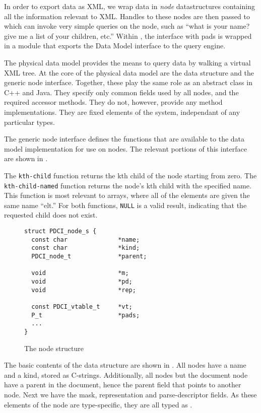 
In order to export \pads{} data as XML, we wrap data in {\em node}
datastructures containing all the information relevant to XML. Handles
to these nodes are then passed to \galax which can invoke very simple
queries on the node, such as ``what is your name? give me a list of
your children, etc.''  Within \galax, the interface with pads is
wrapped in a module that exports the \galax Data Model interface to
the \galax query engine.

The physical data model provides the means to query \pads{} data by
walking a virtual XML tree.  At the core of the physical data model
are the  data structure and the generic node interface.
Together, these play the same role as an abstract class in C++ and
Java. They specify only common fields used by all nodes, and the
required accessor methods. They do not, however, provide any method
implementations. They are fixed elements of the system, independant of
any particular \pads{} types.

The generic node interface defines the functions that are available to the
\pads{} data model implementation for use on nodes. The relevant portions of
this interface are shown in .

The {\tt kth-child} function returns the kth child of the node
starting from zero. The {\tt kth-child-named} function returns the node's kth
child with the specified name. This function is most relevant to
arrays, where all of the elements are given the same name ``elt.''
For both functions, {\tt NULL} is a valid result, indicating that the
requested child does not exist.

\begin{figure}
{\small
\begin{verbatim}
struct PDCI_node_s {
  const char              *name;
  const char              *kind;
  PDCI_node_t             *parent;

  void                    *m;
  void                    *pd;
  void                    *rep;

  const PDCI_vtable_t     *vt;
  P_t                     *pads;
  ...
}
\end{verbatim}
}
\caption{The node structure}
\label{fig:node-struct}
\end{figure}

The basic contents of the  data structure are shown in
. All nodes have a name and a kind, stored as
C-strings. Additionally, all nodes but the document node have a parent
in the document, hence the parent field that points to another node.
Next we have the mask, representation and parse-descriptor fields. As
these elements of the node are type-specific, they are all typed as
\vptr.

